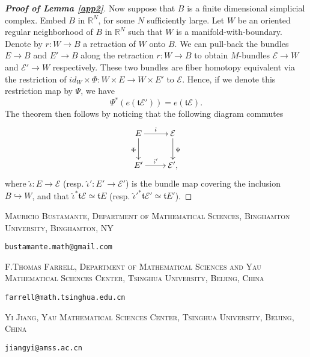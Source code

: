 \documentclass[onecolumn,notitlepage,11pt]{article}
\makeatletter
\newcommand{\R}{\mathbb{R}}
\newcommand{\beq}{\begin{equation*}}
\newcommand{\eeq}{\end{equation*}}
\theoremstyle{definition}
\newcommand{\Addresses}{{%
  \bigskip
  \footnotesize
  \textsc{Mauricio Bustamante}, \textsc{Department of Mathematical Sciences, Binghamton University, Binghamton, NY}\par\nopagebreak
 \texttt{bustamante.math@gmail.com}
  \medskip
  
  \textsc{F.Thomas Farrell}, \textsc{Department of Mathematical Sciences
  and Yau Mathematical Sciences Center, 
  Tsinghua University, Beijing, China}\par\nopagebreak
  \texttt{farrell@math.tsinghua.edu.cn}
  \medskip
  
  \textsc{Yi Jiang}, \textsc{Yau Mathematical Sciences Center, Tsinghua
  University, Beijing, China}\par\nopagebreak
\texttt{jiangyi@amss.ac.cn}
}}
\makeatother
\begin{document}
\begin{proof}[\textbf{Proof of Lemma \ref{app2}}]
Now suppose that $B$ is a finite dimensional simplicial complex. 
Embed $B$ in $\R^N$, for some $N$ sufficiently large. Let $W$ be an oriented
regular neighborhood of $B$ in $\R^N$ such that $W$ is a 
manifold-with-boundary. Denote by $r:W\to B$ a retraction of $W$ onto $B$. 
We can pull-back the bundles $E\to B$ and $E'\to B$ 
along the retraction $r:W\to B$ to obtain $M$-bundles 
$\mathcal{E}\to W$ and $\mathcal{E'}\to W$ respectively.
These two bundles are fiber homotopy equivalent via the restriction
of $id_W\times\Phi:W\times E\to W\times E'$ to $\mathcal{E}$. 
Hence, if we denote this restriction map by $\Psi$, we have
\beq
\Psi^*(e(\mathfrak{t}\mathcal{E}'))=e(\mathfrak{t}\mathcal{E}).
\eeq 
The theorem then follows by noticing that the following diagram
commutes
\beq
\xymatrix{
E\ar[r]^{\hat{\iota}}\ar[d]_{\Phi}&\mathcal{E}\ar[d]^{\Psi}\\
E'\ar[r]^{\hat{\iota}'} & \mathcal{E}',
}
\eeq
where $\hat{\iota}:E\to\mathcal{E}$ 
(resp. $\hat{\iota}':E'\to\mathcal{E}'$) is the bundle
map covering the inclusion
$B\hookrightarrow W$, and that 
$\hat{\iota}^*\mathfrak{t}\mathcal{E}\simeq\mathfrak{t}E$ 
(resp. $\hat{\iota}'^*\mathfrak{t}\mathcal{E}'\simeq\mathfrak{t}E'$).
\end{proof}
 {\footnotesize
 }     %
 
 \Addresses
\end{document}
